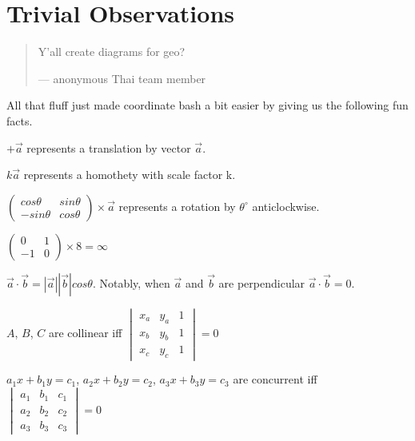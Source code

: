 \documentclass[11pt]{scrartcl}
\begin{document}
\section{Trivial Observations}
\begin{abstract}
  \sffamily
  Y'all create diagrams for geo? 
  \medskip
  
  --- anonymous Thai team member
\end{abstract}
All that fluff just made coordinate bash a bit easier by giving us the following fun facts. 
\begin{fact}
  $+\vec{a}$
  represents a translation by vector $\vec{a}$.
\end{fact}
\begin{fact}
  $k\vec{a}$
  represents a homothety with scale factor k.
\end{fact}
\begin{fact}
  $\begin{pmatrix} cos\theta & sin\theta \\ -sin\theta & cos\theta \end{pmatrix}
  \times
  \vec{a}$
  represents a rotation by $\theta^{\circ}$ anticlockwise.
\end{fact}
\begin{example} 
    $\begin{pmatrix} 0 & 1 \\ -1 & 0 \end{pmatrix}
  \times
  8=\infty$
\end{example}
\begin{fact} 
  $\vec{a}\cdot\vec{b}=|\vec{a}||\vec{b}|cos\theta$. Notably, when $\vec{a}$ and $\vec{b}$ are perpendicular $\vec{a}\cdot\vec{b}=0$.
\end{fact}
\begin{fact}  \label{shoelace}
  $A$, $B$, $C$ are collinear iff $\begin{vmatrix} x_a & y_a & 1 \\ x_b & y_b & 1 \\ x_c & y_c & 1\end{vmatrix} = 0$
\end{fact}
\begin{fact} \label{concurrent}
  $a_1x+b_1y=c_1$, $a_2x+b_2y=c_2$, $a_3x+b_3y=c_3$ are concurrent iff $\begin{vmatrix} a_1 & b_1 & c_1 \\ a_2 & b_2 & c_2 \\ a_3 & b_3 & c_3 \end{vmatrix} = 0$
\end{fact}
\end{document}
